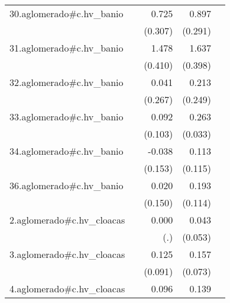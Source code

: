 {\begin{longtable}{l*{4}{D{.}{.}{-1}}}
\addlinespace
30.aglomerado#c.hv\_banio&                     &       0.725\sym{*}  &       0.897\sym{**} &                     \\
            &                     &     (0.307)         &     (0.291)         &                     \\
\addlinespace
31.aglomerado#c.hv\_banio&                     &       1.478\sym{***}&       1.637\sym{***}&                     \\
            &                     &     (0.410)         &     (0.398)         &                     \\
\addlinespace
32.aglomerado#c.hv\_banio&                     &       0.041         &       0.213         &                     \\
            &                     &     (0.267)         &     (0.249)         &                     \\
\addlinespace
33.aglomerado#c.hv\_banio&                     &       0.092         &       0.263\sym{***}&                     \\
            &                     &     (0.103)         &     (0.033)         &                     \\
\addlinespace
34.aglomerado#c.hv\_banio&                     &      -0.038         &       0.113         &                     \\
            &                     &     (0.153)         &     (0.115)         &                     \\
\addlinespace
36.aglomerado#c.hv\_banio&                     &       0.020         &       0.193         &                     \\
            &                     &     (0.150)         &     (0.114)         &                     \\
\addlinespace
2.aglomerado#c.hv\_cloacas&                     &       0.000         &       0.043         &                     \\
            &                     &         (.)         &     (0.053)         &                     \\
\addlinespace
3.aglomerado#c.hv\_cloacas&                     &       0.125         &       0.157\sym{*}  &                     \\
            &                     &     (0.091)         &     (0.073)         &                     \\
\addlinespace
4.aglomerado#c.hv\_cloacas&                     &       0.096         &       0.139\sym{***}&                     \\

\end{longtable}}
